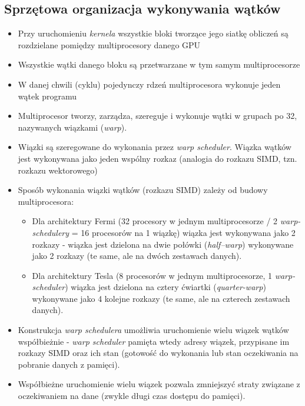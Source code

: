 		\subsection{Sprzętowa organizacja wykonywania wątków}
			\begin{itemize}
				\item Przy uruchomieniu \textit{kernela} wszystkie bloki tworzące jego siatkę obliczeń są rozdzielane pomiędzy multiprocesory danego GPU
				\item Wszystkie wątki danego bloku są przetwarzane w tym samym multiprocesorze
				\item W danej chwili (cyklu) pojedynczy rdzeń multiprocesora wykonuje jeden wątek programu
				\item Multiprocesor tworzy, zarządza, szereguje i wykonuje wątki w grupach po 32, nazywanych wiązkami (\emph{warp}).
				\item Wiązki są szeregowane do wykonania przez \emph{warp scheduler}. Wiązka wątków jest wykonywana jako jeden wspólny rozkaz (analogia do rozkazu SIMD, tzn. rozkazu wektorowego)
				\item Sposób wykonania wiązki wątków (rozkazu SIMD) zależy od budowy multiprocesora:
				\begin{itemize}
					\item Dla architektury Fermi (32 procesory w jednym multiprocesorze / 2 \emph{warp-schedulery} = 16 procesorów na 1 wiązkę) wiązka jest wykonywana jako 2 rozkazy - wiązka jest dzielona na dwie połówki (\emph{half–warp}) wykonywane jako 2 rozkazy (te same, ale na dwóch zestawach danych).
					\item Dla architektury Tesla (8 procesorów w jednym multiprocesorze, 1 \emph{warp-scheduler}) wiązka jest dzielona na cztery ćwiartki (\emph{quarter-warp}) wykonywane jako 4 kolejne rozkazy (te same, ale na czterech zestawach danych).
				\end{itemize}
				\item Konstrukcja \emph{warp schedulera} umożliwia uruchomienie wielu wiązek wątków współbieżnie -\emph{ warp scheduler }pamięta wtedy adresy wiązek, przypisane im rozkazy SIMD oraz ich stan (gotowość do wykonania lub stan oczekiwania na pobranie danych z pamięci).
				\item Współbieżne uruchomienie wielu wiązek pozwala zmniejszyć straty związane z oczekiwaniem na dane (zwykle długi czas dostępu do pamięci).
			\end{itemize}

\newpage
